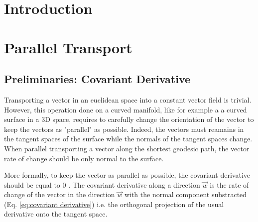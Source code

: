 \documentclass[sigconf]{acmart}
\begin{document}



\maketitle

\section{Introduction}

\section{Parallel Transport}

\subsection{Preliminaries: Covariant Derivative}
Transporting a vector in an euclidean space into a constant vector field is trivial. However, this operation done on a curved manifold, like for example a a curved surface in a 3D space, requires to carefully change the orientation of the vector to keep the vectors as "parallel" as possible. Indeed, the vectors must reamains in the tangent spaces of the surface while the normals of the tangent spaces change. When parallel transporting a vector along the shortest geodesic path, the vector rate of change should be only normal to the surface. 

More formally, to keep the vector as parallel as possible, the covariant derivative should be equal to 0 \cite{youtube_video}. The covariant derivative along a direction $\vec{w} $ is the rate of change of the vector in the direction $\vec{w}$ with the normal component substracted (Eq. \ref{eq:covariant derivative}) i.e. the orthogonal projection of the usual derivative onto the tangent space.
\end{document}
